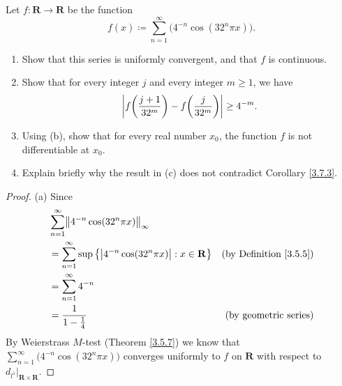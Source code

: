 \begin{exercise}\label{ex 4.7.10}
    Let \(f : \mathbf{R} \to \mathbf{R}\) be the function
    \[
        f(x) \coloneqq \sum_{n = 1}^\infty \big(4^{-n} \cos(32^n \pi x)\big).
    \]
    \begin{enumerate}
        \item Show that this series is uniformly convergent, and that \(f\) is continuous.
        \item Show that for every integer \(j\) and every integer \(m \geq 1\), we have
              \[
                  \abs*{f\bigg(\frac{j + 1}{32^m}\bigg) - f\bigg(\frac{j}{32^m}\bigg)} \geq 4^{-m}.
              \]
        \item Using (b), show that for every real number \(x_0\), the function \(f\) is not differentiable at \(x_0\).
        \item Explain briefly why the result in (c) does not contradict Corollary \ref{3.7.3}.
    \end{enumerate}
\end{exercise}

\begin{proof}{(a)}
    Since
    \begin{align*}
         & \sum_{n = 1}^\infty \norm*{4^{-n} \cos(32^n \pi x)}_{\infty}                                                                 \\
         & = \sum_{n = 1}^\infty \sup\big\{\abs*{4^{-n} \cos(32^n \pi x)} : x \in \mathbf{R}\big\} & \text{(by Definition \ref{3.5.5})} \\
         & = \sum_{n = 1}^\infty 4^{-n}                                                                                                 \\
         & = \frac{1}{1 - \frac{1}{4}}                                                             & \text{(by geometric series)}
    \end{align*}
    By Weierstrass \(M\)-test (Theorem \ref{3.5.7}) we know that \(\sum_{n = 1}^\infty \big(4^{-n} \cos(32^n \pi x)\big)\) converges uniformly to \(f\) on \(\mathbf{R}\) with respect to \(d_{l^1}|_{\mathbf{R} \times \mathbf{R}}\).
\end{proof}

